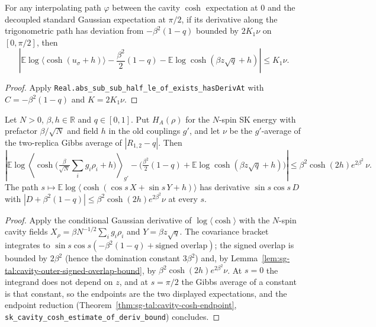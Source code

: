 \begin{theorem}
\label{thm:sg-tal:cavity-cosh-endpoint}
  \leanok
{}
For any interpolating path $\varphi$ between the cavity $\cosh$ expectation at $0$ and the decoupled
standard Gaussian expectation at $\pi / 2$, if its derivative along the trigonometric path has
deviation from $-\beta^2(1-q)$ bounded by $2 K_1 \nu$ on $[0, \pi/2]$, then
\[
  \left|\mathbb E \log \langle \cosh(u_\sigma + h) \rangle - \frac{\beta^2}{2}(1-q) - \mathbb E \log \cosh(\beta z \sqrt q + h)\right| \le K_1 \nu.
\]
\end{theorem}
\begin{proof}
  \leanok
Apply \texttt{Real.abs\_sub\_sub\_half\_le\_of\_exists\_hasDerivAt} with $C = -\beta^2(1-q)$ and $K = 2 K_1 \nu$.
\end{proof}

\begin{theorem}
\label{thm:sg-tal:cavity-cosh-estimate}
  \leanok
{}
Let $N>0$, $\beta,h\in\mathbb R$ and $q\in[0,1]$.  Put $H_A(\rho)$ for the $N$-spin SK energy
with prefactor $\beta/\sqrt N$ and field $h$ in the old couplings $g'$, and let $\nu$ be the
$g'$-average of the two-replica Gibbs average of $|R_{1,2}-q|$.  Then
\[
 \left|\mathbb E\log\left\langle\cosh\Big(\tfrac{\beta}{\sqrt N}\sum_i g_i\rho_i+h\Big)
 \right\rangle_{g'}-\Big(\tfrac{\beta^2}{2}(1-q)+\mathbb E\log\cosh(\beta z\sqrt q+h)\Big)\right|
 \le\beta^2\cosh(2h)e^{2\beta^2}\,\nu .
\]
The path $s\mapsto\mathbb E\log\langle\cosh(\cos s\,X+\sin s\,Y+h)\rangle$ has derivative
$\sin s\cos s\,D$ with $|D+\beta^2(1-q)|\le\beta^2\cosh(2h)e^{2\beta^2}\nu$ at every $s$.
\end{theorem}
\begin{proof}
  \leanok
Apply the conditional Gaussian derivative of $\log\langle\cosh\rangle$ with the
$N$-spin cavity fields $X_\rho=\beta N^{-1/2}\sum_i g_i\rho_i$ and $Y=\beta z\sqrt q$.
The covariance bracket integrates to $\sin s\cos s(-\beta^2(1-q)+\text{signed overlap})$; the
signed overlap is bounded by $2\beta^2$ (hence the domination constant $3\beta^2$) and, by
Lemma~\ref{lem:sg-tal:cavity-outer-signed-overlap-bound}, by $\beta^2\cosh(2h)e^{2\beta^2}\nu$.  At $s=0$ the integrand does not depend
on $z$, and at $s=\pi/2$ the Gibbs average of a constant is that constant, so the endpoints are
the two displayed expectations, and the endpoint reduction
(Theorem~\ref{thm:sg-tal:cavity-cosh-endpoint},
\texttt{sk\_cavity\_cosh\_estimate\_of\_deriv\_bound}) concludes.
\end{proof}

